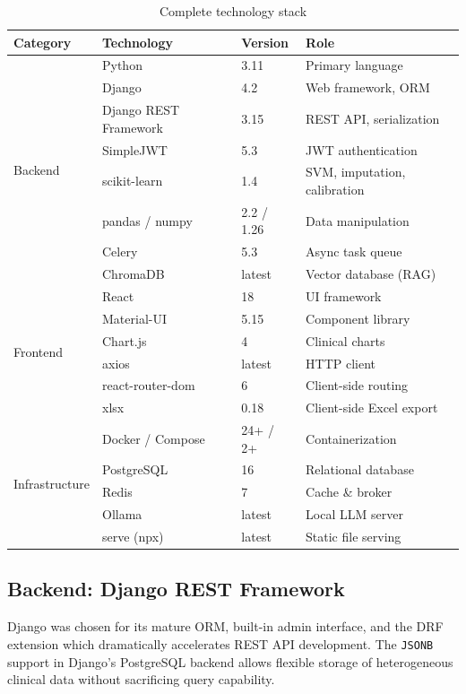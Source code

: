 \documentclass[12pt,a4paper,twoside]{report}
\begin{document}
\begin{table}[htbp]
\centering
\caption{Complete technology stack}
\label{tab:tech_stack}
\begin{tabular}{llll}
\toprule
\textbf{Category} & \textbf{Technology} & \textbf{Version} & \textbf{Role} \\
\midrule
\multirow{8}{*}{Backend}
  & Python & 3.11 & Primary language \\
  & Django & 4.2 & Web framework, ORM \\
  & Django REST Framework & 3.15 & REST API, serialization \\
  & SimpleJWT & 5.3 & JWT authentication \\
  & scikit-learn & 1.4 & SVM, imputation, calibration \\
  & pandas / numpy & 2.2 / 1.26 & Data manipulation \\
  & Celery & 5.3 & Async task queue \\
  & ChromaDB & latest & Vector database (RAG) \\
\midrule
\multirow{6}{*}{Frontend}
  & React & 18 & UI framework \\
  & Material-UI & 5.15 & Component library \\
  & Chart.js & 4 & Clinical charts \\
  & axios & latest & HTTP client \\
  & react-router-dom & 6 & Client-side routing \\
  & xlsx & 0.18 & Client-side Excel export \\
\midrule
\multirow{5}{*}{Infrastructure}
  & Docker / Compose & 24+ / 2+ & Containerization \\
  & PostgreSQL & 16 & Relational database \\
  & Redis & 7 & Cache \& broker \\
  & Ollama & latest & Local LLM server \\
  & serve (npx) & latest & Static file serving \\
\bottomrule
\end{tabular}
\end{table}

\subsection{Backend: Django REST Framework}

Django was chosen for its mature ORM, built-in admin interface, and the DRF extension which dramatically accelerates REST API development. The \texttt{JSONB} support in Django's PostgreSQL backend allows flexible storage of heterogeneous clinical data without sacrificing query capability.
\end{document}
